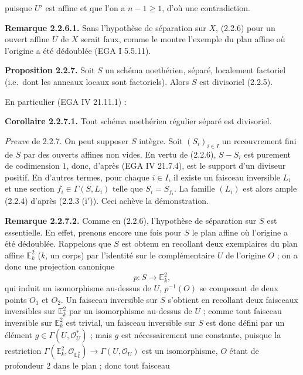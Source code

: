 puisque $U'$ est affine et que l'on a $n-1\ge1$, d'où une contradiction.

\textbf{Remarque 2.2.6.1.} Sans l'hypothèse de séparation sur $X$, (2.2.6) pour un ouvert affine $U$ de $X$ serait faux, comme le montre l'exemple du plan affine où l'origine a été dédoublée (EGA I 5.5.11).

\textbf{Proposition 2.2.7.} Soit $S$ un schéma noethérien, séparé, localement factoriel (i.e.\ dont les anneaux locaux sont factoriels). Alors $S$ est divisoriel (2.2.5).

En particulier (EGA IV 21.11.1) :

\textbf{Corollaire 2.2.7.1.} Tout schéma noethérien régulier séparé est divisoriel.

\emph{Preuve} de 2.2.7. On peut supposer $S$ intègre. Soit $(S_i)_{i\in I}$ un recouvrement fini de $S$ par des ouverts affines non vides. En vertu de (2.2.6), $S-S_i$ est purement de codimension $1$, donc, d'après (EGA IV 21.7.4), est le support d'un diviseur positif. En d'autres termes, pour chaque $i\in I$, il existe un faisceau inversible $L_i$ et une section $f_i\in\Gamma(S,L_i)$ telle que $S_i=S_{f_i}$. La famille $(L_i)$ est alors ample (2.2.4) d'après (2.2.3 (i$'$)). Ceci achève la démonstration.

\textbf{Remarque 2.2.7.2.} Comme en (2.2.6), l'hypothèse de séparation sur $S$ est essentielle. En effet, prenons encore une fois pour $S$ le plan affine où l'origine a été dédoublée. Rappelons que $S$ est obtenu en recollant deux exemplaires du plan affine $\mathbb E^2_k$ ($k$, un corps) par l'identité sur le complémentaire $U$ de l'origine $O$ ; on a donc une projection canonique
\[
p:S\longrightarrow\mathbb E^2_k,
\]
qui induit un isomorphisme au-dessus de $U$, $p^{-1}(O)$ se composant de deux points $O_1$ et $O_2$. Un faisceau inversible sur $S$ s'obtient en recollant deux faisceaux inversibles sur $\mathbb E^2_k$ par un isomorphisme au-dessus de $U$ ; comme tout faisceau inversible sur $\mathbb E^2_k$ est trivial, un faisceau inversible sur $S$ est donc défini par un élément $g\in\Gamma(U,\mathcal O_U^*)$ ; mais $g$ est nécessairement une constante, puisque la restriction $\Gamma(\mathbb E^2_k,\mathcal O_{\mathbb E^2_k})\to\Gamma(U,\mathcal O_U)$ est un isomorphisme, $O$ étant de profondeur $2$ dans le plan ; donc tout faisceau
